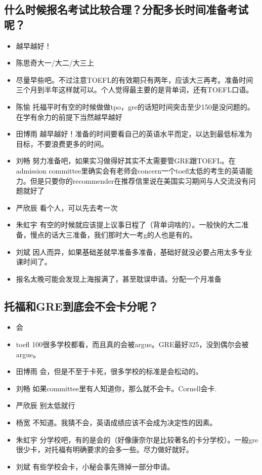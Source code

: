 \documentclass{vivid_layout}
\begin{document}
\subsection{ 什么时候报名考试比较合理？分配多长时间准备考试呢？}
\begin{itemize}
\item 越早越好！
\item { 陈思奇}\quad 大一/大二/大三上
\item 尽量早些吧。不过注意TOEFL的有效期只有两年，应该大三再考。准备时间三个月到半年这样就可以。个人觉得最主要的是背单词，还有TOEFL口语。
\item  { 陈愉}  \quad 托福平时有空的时候做做tpo，gre的话短时间突击至少150是没问题的。在学有余力的前提下当然越早越好
\item  { 田博雨}  \quad 越早越好！准备的时间要看自己的英语水平而定，以达到最低标准为目标，不要浪费更多的时间。
\item  { 刘畅}  \quad 努力准备吧，如果实习做得好其实不太需要管GRE跟TOEFL。在admission committee里确实会有老师会concern一个toefl太低的考生的英语能力。但是只要你的recommender在推荐信里说在美国实习期间与人交流没有问题就好了
\item  { 严欣辰}  \quad 看个人，可以先去考一次
\item  { 朱虹宇}  \quad 有空的时候就应该提上议事日程了（背单词啥的）。一般快的大二准备，慢点的话大三准备，我们那时大一考g的人也是有的。
\item  { 刘斌}  \quad 因人而异，如果基础差就早准备多准备，基础好就没必要占用太多专业课时间了。
\item 报名太晚可能会发现上海报满了，甚至耽误申请。分配一个月准备
\end{itemize}

\subsection{托福和GRE到底会不会卡分呢？}
\begin{itemize}
\item 会
\item toefl 100很多学校都看，而且真的会被argue。GRE最好325，没到偶尔会被argue。
\item  { 田博雨}  \quad 会，但是不至于卡死，很多学校的标准是会松动的。
\item  { 刘畅}  \quad 如果committee里有人知道你，那么就不会卡。Cornell会卡.
\item  { 严欣辰}  \quad 别太低就行
\item  { 杨宽}  \quad 不知道。我猜不会，英语成绩应该不会成为决定性的因素。
\item  { 朱虹宇}  \quad 分学校吧，有的是会的（好像康奈尔是比较著名的卡分学校）。一般gre很少卡，对托福有明确要求的会多一些。尽力做好就好。
\item  { 刘斌}  \quad 有些学校会卡，小秘会事先筛掉一部分申请。
\end{itemize}
\end{document}

